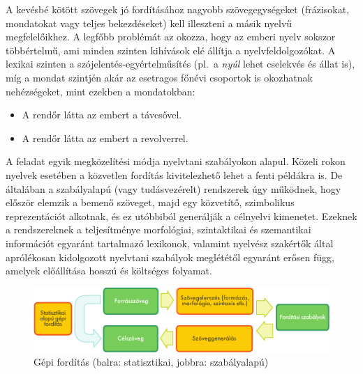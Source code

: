 \begin{multicols}{2}

A kevésbé kötött szövegek jó fordításához nagyobb szö\-veg\-egy\-sé\-ge\-ket (frá\-zi\-so\-kat, mon\-da\-to\-kat vagy teljes bekezdéseket) kell illeszteni a másik nyelvű megfelelőikhez. A legfőbb problémát az okozza, hogy az emberi nyelv sokszor többértelmű, ami minden szinten kihívások elé állítja a nyelvfeldolgozókat. A lexikai szinten a szójelentés-egyértelműsítés (pl.\ a \textit{nyúl} lehet cselekvés és állat is), míg a mondat szintjén akár az esetragos főnévi csoportok is okozhatnak nehézségeket, mint ezekben a mondatokban:

\begin{itemize}
\item A rendőr látta az embert a távcsővel. 
\item A rendőr látta az embert a revolverrel.
\end{itemize}

A feladat egyik megközelítési módja nyelvtani szabályokon alapul. Közeli rokon nyelvek esetében a közvetlen fordítás kivitelezhető lehet a fenti példákra is. De általában a szabályalapú (vagy tu\-dás\-ve\-zé\-relt) rendszerek úgy működnek, hogy először elemzik a bemenő szöveget, majd egy közvetítő, szimbolikus reprezentációt alkotnak, és ez utóbbiból generálják a célnyelvi kimenetet. Ezeknek a rend\-sze\-rek\-nek a teljesítménye morfológiai, szintaktikai és szemantikai információt egyaránt tartalmazó lexikonok, valamint nyelvész szakértők által aprólékosan kidolgozott nyelvtani szabályok meglététől egyaránt erősen függ, amelyek előállítása hosszú és költséges folyamat.

\begin{figure}[htb]
  \center
  \includegraphics[width=\textwidth]{../_media/hungarian/machine_translation}
  \caption{Gépi fordítás (balra: statisztikai, jobbra: szabályalapú)}
  \label{fig:mtarch_de}
\end{figure}


\end{multicols}
